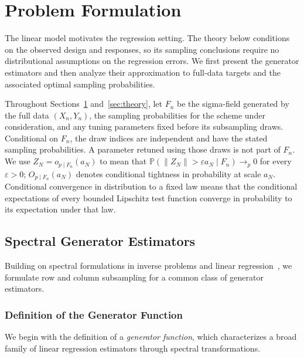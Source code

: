 \documentclass[pdflatex,iicol,sn-mathphys-ay]{sn-jnl}
\theoremstyle{thmstyleone}
\theoremstyle{thmstylethree}
\theoremstyle{thmstyletwo}
\newcommand{\Prob}{\mathbb P}
\begin{document}
\section{Problem Formulation}
\label{sec:formulation}

The linear model motivates the regression setting. The theory below conditions on the observed design and responses, so its sampling conclusions require no distributional assumptions on the regression errors. We first present the generator estimators and then analyze their approximation to full-data targets and the associated optimal sampling probabilities.

Throughout Sections~\ref{sec:formulation} and~\ref{sec:theory}, let $F_n$ be the sigma-field generated by the full data $(X_n,Y_n)$, the sampling probabilities for the scheme under consideration, and any tuning parameters fixed before its subsampling draws. Conditional on $F_n$, the draw indices are independent and have the stated sampling probabilities. A parameter retuned using those draws is not part of $F_n$. We use $Z_N=o_{p\mid F_n}(a_N)$ to mean that $\Prob(\|Z_N\|>\varepsilon a_N\mid F_n)\to_p0$ for every $\varepsilon>0$; $O_{p\mid F_n}(a_N)$ denotes conditional tightness in probability at scale $a_N$. Conditional convergence in distribution to a fixed law means that the conditional expectations of every bounded Lipschitz test function converge in probability to its expectation under that law.

\subsection{Spectral Generator Estimators}
\label{subsec:theoretical_framework}

Building on spectral formulations in inverse problems and linear regression~\citep{engl1996regularization,wang2024linear}, we formulate row and column subsampling for a common class of generator estimators.

\subsubsection{Definition of the Generator Function}
\label{subsubsec:generator_def}

We begin with the definition of a \emph{generator function}, which characterizes a broad family of linear regression estimators through spectral transformations.
\end{document}
